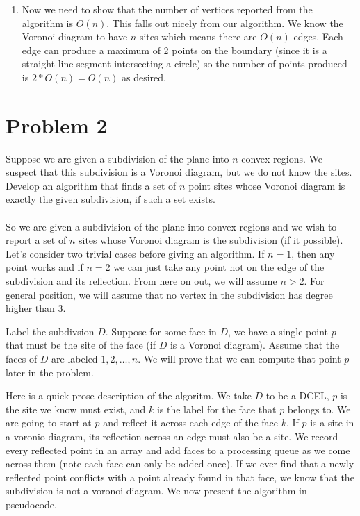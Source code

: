 \documentclass[11pt]{article}
\begin{document}
\begin{enumerate}
    \item Now we need to show that the number of vertices reported from the algorithm is $O(n)$.
    This falls out nicely from our algorithm.
    We know the Voronoi diagram to have $n$ sites which means there are $O(n)$ edges.
    Each edge can produce a maximum of 2 points on the boundary (since it is a straight line segment intersecting a circle) so the number of points produced is $2*O(n) = O(n)$ as desired.
\end{enumerate}

\newpage
\section*{Problem 2}

Suppose we are given a subdivision of the plane into $n$ convex regions. We
suspect that this subdivision is a Voronoi diagram, but we do not know the
sites. Develop an algorithm that finds a set of $n$ point sites whose Voronoi diagram is exactly the given subdivision, if such a set exists. \\\\

\answer
So we are given a subdivision of the plane into convex regions and we wish to report a set of $n$ sites whose Voronoi diagram is the subdivision (if it possible).
Let's consider two trivial cases before giving an algorithm.
If $n=1$, then any point works and if $n=2$ we can just take any point not on the edge of the subdivision and its reflection.
From here on out, we will assume $n > 2$.
For general position, we will assume that no vertex in the subdivision has degree higher than 3.

Label the subdivsion $D$.
Suppose for some face in $D$, we have a single point $p$ that must be the site of the face (if $D$ is a Voronoi diagram).
Assume that the faces of $D$ are labeled $1, 2, \ldots, n$.
We will prove that we can compute that point $p$ later in the problem.

Here is a quick prose description of the algoritm.
We take $D$ to be a DCEL, $p$ is the site we know must exist, and $k$ is the label for the face that $p$ belongs to.
We are going to start at $p$ and reflect it across each edge of the face $k$.
If $p$ is a site in a voronio diagram, its reflection across an edge must also be a site.
We record every reflected point in an array and add faces to a processing queue as we come across them (note each face can only be added once).
If we ever find that a newly reflected point conflicts with a point already found in that face, we know that the subdivision is not a voronoi diagram.
We now present the algorithm in pseudocode.
\end{document}
